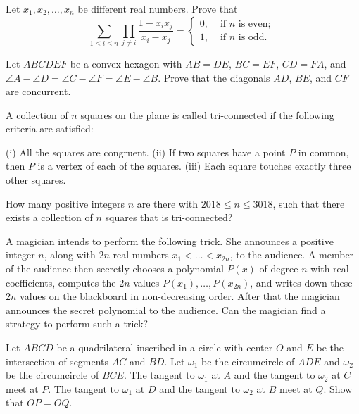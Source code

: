 \documentclass[11pt]{scrartcl}
\begin{document}
\begin{problem}[443006607452241]
Let $x_1, x_2, \dots, x_n$ be different real numbers. Prove that
\[\sum_{1 \leqslant i \leqslant n} \prod_{j \neq i} \frac{1-x_{i} x_{j}}{x_{i}-x_{j}}=\left\{\begin{array}{ll}
0, & \text { if } n \text { is even; } \\
1, & \text { if } n \text { is odd. }
\end{array}\right.\]
\end{problem}
\begin{problem}[447212157564770]
	Let $ABCDEF$ be a convex hexagon with $AB=DE$, $BC=EF$, $CD=FA$, and $\angle A-\angle D = \angle C -\angle F = \angle E -\angle B$. Prove that the diagonals $AD$, $BE$, and $CF$ are concurrent.
\end{problem}
\begin{problem}[447976536517137]
A collection of $n$ squares on the plane is called tri-connected if the following criteria are satisfied:

(i) All the squares are congruent.
(ii) If two squares have a point $P$ in common, then $P$ is a vertex of each of the squares.
(iii) Each square touches exactly three other squares.

How many positive integers $n$ are there with $2018\leq n \leq 3018$, such that there exists a collection of $n$ squares that is tri-connected?
\end{problem}
\begin{problem}[448881061747528]
A magician intends to perform the following trick. She announces a positive integer $n$, along with $2n$ real numbers $x_1 < \dots < x_{2n}$, to the audience. A member of the audience then secretly chooses a polynomial $P(x)$ of degree $n$ with real coefficients, computes the $2n$ values $P(x_1), \dots , P(x_{2n})$, and writes down these $2n$ values on the blackboard in non-decreasing order. After that the magician announces the secret polynomial to the audience. Can the magician find a strategy to perform such a trick?
\end{problem}
\begin{problem}[451078820354844]
	Let $ABCD$ be a quadrilateral inscribed in a circle with center $O$ and $E$ be the intersection of segments $AC$ and $BD$. Let $\omega_1$ be the circumcircle of $ADE$ and $\omega_2$ be the circumcircle of $BCE$. The tangent to $\omega_1$ at $A$ and the tangent to $\omega_2$ at $C$ meet at $P$. The tangent to $\omega_1$ at $D$ and the tangent to $\omega_2$ at $B$ meet at $Q$. Show that $OP=OQ$.
\end{problem}
\end{document}
